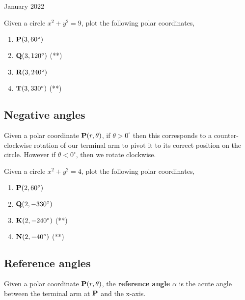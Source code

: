 \documentclass[12pt,oneside]{book} %
\begin{document}
\begin{lec}{January 2022}
   \begin{ex}
     Given a circle $x^2 + y^2 = 9$, plot the following polar coordinates,
     \begin{enumerate}[label=(\alph*)]
       \item $\vb P(3, 60^{\circ})$
       \item $\vb Q(3, 120^{\circ})$ \hfill (**)
       \item $\vb R(3, 240^{\circ})$
       \item $\vb T(3, 330^{\circ})$ \hfill (**)
     \end{enumerate}

   \end{ex}

   \subsection*{Negative angles}
   \begin{rem}
       Given a polar coordinate $\vb P(r, \theta)$, if  $\theta > 0^{\circ}$ then this corresponds to a counter-clockwise rotation
       of our terminal arm to pivot it to its correct position on the circle. However if $\theta < 0^{\circ}$, then we
       rotate clockwise.
   \end{rem}

   \begin{ex}
     Given a circle $x^2 + y^2 = 4$, plot the following polar coordinates,
     \begin{enumerate}[label=(\alph*)]
       \item $\vb P(2, 60^{\circ})$
       \item $\vb Q(2, -330^{\circ})$
       \item $\vb K(2, -240^{\circ})$ \hfill (**)
       \item $\vb N(2, -40^{\circ})$ \hfill (**)
     \end{enumerate}

   \end{ex}

   \subsection*{Reference angles}
   \begin{defn}
     Given a polar coordinate $\vb P(r, \theta)$, the \textbf{reference angle} $\alpha$ is the \underline{acute angle} between the
     terminal arm at $\vb P$ and the x-axis.
   \end{defn}


\end{lec}
\end{document}
